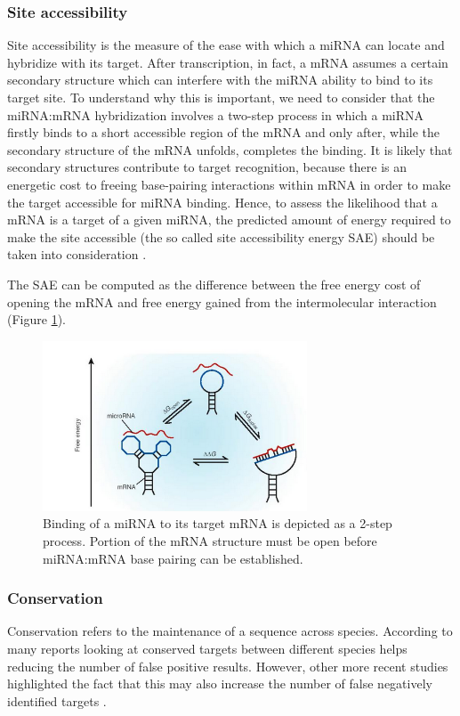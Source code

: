 \subsubsection{Site accessibility}
Site accessibility is the measure of the ease with which a miRNA can locate and hybridize with its target. After transcription, in fact,  a mRNA assumes a certain secondary structure which can interfere with the miRNA ability to bind to its target site. To understand why this is important, we need to consider that the miRNA:mRNA hybridization involves  a two-step process in which a miRNA firstly binds to a short accessible region of the mRNA and only after, while the secondary structure of the mRNA unfolds, completes the binding.  It is likely that secondary structures contribute to target recognition, because there is an energetic cost to freeing base-pairing interactions within mRNA in order to make the target accessible for miRNA binding. Hence, to assess the likelihood that a mRNA is a target of a given miRNA, the predicted amount of energy required to make the site accessible (the so called site accessibility energy SAE) should be taken into consideration \cite{accessibility_nrg_role}.

The SAE	can be computed as the difference between the free energy cost of opening the mRNA and free energy gained from the intermolecular interaction (Figure \ref{fig:opening_energy}).

\begin{figure}[hbt!]
	\centering
	\includegraphics[width=0.7\textwidth]{Figures/opening_energy}
	\caption{Binding of a miRNA to its target mRNA is depicted as a 2-step process. Portion of the mRNA structure must be open before miRNA:mRNA base pairing can be established.}
	\label{fig:opening_energy}
\end{figure}

\subsubsection{Conservation}
Conservation refers to the maintenance of a sequence across species. According to many reports \cite{computational_methods} looking at conserved targets between different species helps reducing the number of false positive results. However, other more recent studies highlighted the fact that this may also increase the number of false negatively identified targets \cite{conserved_pairing}.